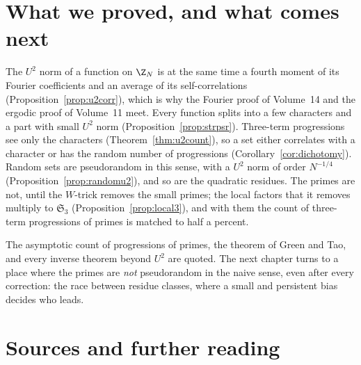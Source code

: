 \section{What we proved, and what comes next}

The $U^2$ norm of a function on $\Z_N$ is at the same time a fourth moment of its Fourier coefficients and an average of its self-correlations (Proposition~\ref{prop:u2corr}), which is why the Fourier proof of Volume~14 and the ergodic proof of Volume~11 meet. Every function splits into a few characters and a part with small $U^2$ norm (Proposition~\ref{prop:strpsr}). Three-term progressions see only the characters (Theorem~\ref{thm:u2count}), so a set either correlates with a character or has the random number of progressions (Corollary~\ref{cor:dichotomy}). Random sets are pseudorandom in this sense, with a $U^2$ norm of order $N^{-1/4}$ (Proposition~\ref{prop:randomu2}), and so are the quadratic residues. The primes are not, until the $W$-trick removes the small primes; the local factors that it removes multiply to $\mathfrak S_3$ (Proposition~\ref{prop:local3}), and with them the count of three-term progressions of primes is matched to half a percent.

The asymptotic count of progressions of primes, the theorem of Green and Tao, and every inverse theorem beyond $U^2$ are quoted. The next chapter turns to a place where the primes are \emph{not} pseudorandom in the naive sense, even after every correction: the race between residue classes, where a small and persistent bias decides who leads.

\section*{Sources and further reading}

